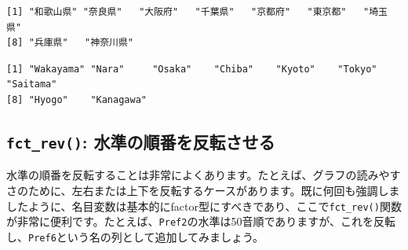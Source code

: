 \documentclass[
  a4paper,
  pandoc,
  ja=standard,
  jafont=haranoaji]{bxjsbook}
\newenvironment{Shaded}{\begin{snugshade}}{\end{snugshade}}
\newcommand{\AttributeTok}[1]{\textcolor[rgb]{0.00,0.48,0.65}{#1}}
\newcommand{\CommentTok}[1]{\textcolor[rgb]{0.37,0.37,0.37}{#1}}
\newcommand{\FunctionTok}[1]{\textcolor[rgb]{0.28,0.35,0.67}{#1}}
\newcommand{\NormalTok}[1]{\textcolor[rgb]{0.00,0.48,0.65}{#1}}
\newcommand{\OtherTok}[1]{\textcolor[rgb]{0.00,0.48,0.65}{#1}}
\newcommand{\SpecialCharTok}[1]{\textcolor[rgb]{0.37,0.37,0.37}{#1}}
\begin{document}
\begin{Shaded}
\end{Shaded}

\begin{verbatim}
[1] "和歌山県" "奈良県"   "大阪府"   "千葉県"   "京都府"   "東京都"   "埼玉県"  
[8] "兵庫県"   "神奈川県"
\end{verbatim}

\begin{Shaded}
\end{Shaded}

\begin{verbatim}
[1] "Wakayama" "Nara"     "Osaka"    "Chiba"    "Kyoto"    "Tokyo"    "Saitama" 
[8] "Hyogo"    "Kanagawa"
\end{verbatim}

\hypertarget{fct_rev-ux6c34ux6e96ux306eux9806ux756aux3092ux53cdux8ee2ux3055ux305bux308b}{%
\subsection{\texorpdfstring{\texttt{fct\_rev()}:
水準の順番を反転させる}{fct\_rev(): 水準の順番を反転させる}}\label{fct_rev-ux6c34ux6e96ux306eux9806ux756aux3092ux53cdux8ee2ux3055ux305bux308b}}

水準の順番を反転することは非常によくあります。たとえば、グラフの読みやすさのために、左右または上下を反転するケースがあります。既に何回も強調しましたように、名目変数は基本的にfactor型にすべきであり、ここで\texttt{fct\_rev()}関数が非常に便利です。たとえば、\texttt{Pref2}の水準は50音順でありますが、これを反転し、\texttt{Pref6}という名の列として追加してみましょう。

\begin{Shaded}
\end{Shaded}
\end{document}
